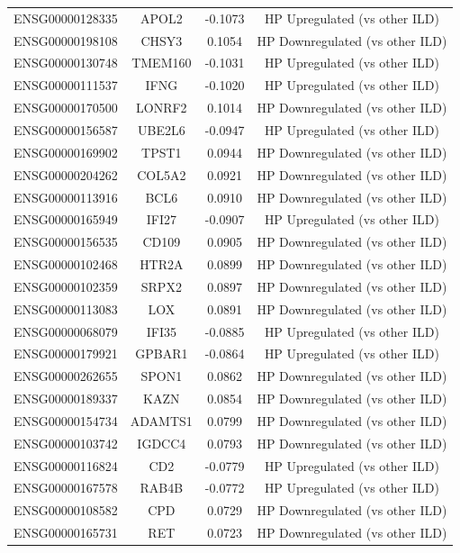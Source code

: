 \documentclass[
]{article}
\begin{document}
\begin{singlespace}
\begin{longtable}[t]{lccc}
ENSG00000128335 & APOL2 & -0.1073 & HP Upregulated (vs other ILD)\\
\addlinespace
ENSG00000198108 & CHSY3 & 0.1054 & HP Downregulated (vs other ILD)\\
ENSG00000130748 & TMEM160 & -0.1031 & HP Upregulated (vs other ILD)\\
ENSG00000111537 & IFNG & -0.1020 & HP Upregulated (vs other ILD)\\
ENSG00000170500 & LONRF2 & 0.1014 & HP Downregulated (vs other ILD)\\
ENSG00000156587 & UBE2L6 & -0.0947 & HP Upregulated (vs other ILD)\\
\addlinespace
ENSG00000169902 & TPST1 & 0.0944 & HP Downregulated (vs other ILD)\\
ENSG00000204262 & COL5A2 & 0.0921 & HP Downregulated (vs other ILD)\\
ENSG00000113916 & BCL6 & 0.0910 & HP Downregulated (vs other ILD)\\
ENSG00000165949 & IFI27 & -0.0907 & HP Upregulated (vs other ILD)\\
ENSG00000156535 & CD109 & 0.0905 & HP Downregulated (vs other ILD)\\
\addlinespace
ENSG00000102468 & HTR2A & 0.0899 & HP Downregulated (vs other ILD)\\
ENSG00000102359 & SRPX2 & 0.0897 & HP Downregulated (vs other ILD)\\
ENSG00000113083 & LOX & 0.0891 & HP Downregulated (vs other ILD)\\
ENSG00000068079 & IFI35 & -0.0885 & HP Upregulated (vs other ILD)\\
ENSG00000179921 & GPBAR1 & -0.0864 & HP Upregulated (vs other ILD)\\
\addlinespace
ENSG00000262655 & SPON1 & 0.0862 & HP Downregulated (vs other ILD)\\
ENSG00000189337 & KAZN & 0.0854 & HP Downregulated (vs other ILD)\\
ENSG00000154734 & ADAMTS1 & 0.0799 & HP Downregulated (vs other ILD)\\
ENSG00000103742 & IGDCC4 & 0.0793 & HP Downregulated (vs other ILD)\\
ENSG00000116824 & CD2 & -0.0779 & HP Upregulated (vs other ILD)\\
\addlinespace
ENSG00000167578 & RAB4B & -0.0772 & HP Upregulated (vs other ILD)\\
ENSG00000108582 & CPD & 0.0729 & HP Downregulated (vs other ILD)\\
ENSG00000165731 & RET & 0.0723 & HP Downregulated (vs other ILD)\\

\end{longtable}
\end{singlespace}
\end{document}
